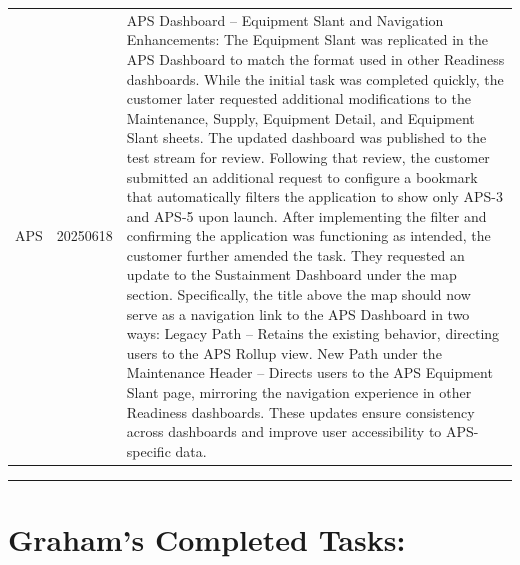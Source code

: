 \documentclass{article}
\begin{document}
\begin{longtable}{@{}p{2.5cm} p{2.5cm} p{9cm}@{}}
\\[-0.5ex]  %


APS & 20250618 & APS Dashboard – Equipment Slant and Navigation Enhancements: The Equipment Slant was replicated in the APS Dashboard to match the format used in other Readiness dashboards. While the initial task was completed quickly, the customer later requested additional modifications to the Maintenance, Supply, Equipment Detail, and Equipment Slant sheets. The updated dashboard was published to the test stream for review.  Following that review, the customer submitted an additional request to configure a bookmark that automatically filters the application to show only APS-3 and APS-5 upon launch. After implementing the filter and confirming the application was functioning as intended, the customer further amended the task.  They requested an update to the Sustainment Dashboard under the map section. Specifically, the title above the map should now serve as a navigation link to the APS Dashboard in two ways:      Legacy Path – Retains the existing behavior, directing users to the APS Rollup view.      New Path under the Maintenance Header – Directs users to the APS Equipment Slant page, mirroring the navigation experience in other Readiness dashboards.  These updates ensure consistency across dashboards and improve user accessibility to APS-specific data. \\


\end{longtable}


\vspace{0.5cm}
\hrule
\vspace{1cm}


\section*{\centering \textbf{ Graham's Completed Tasks: }}
\label{sec:graham_tasks}
\end{document}
